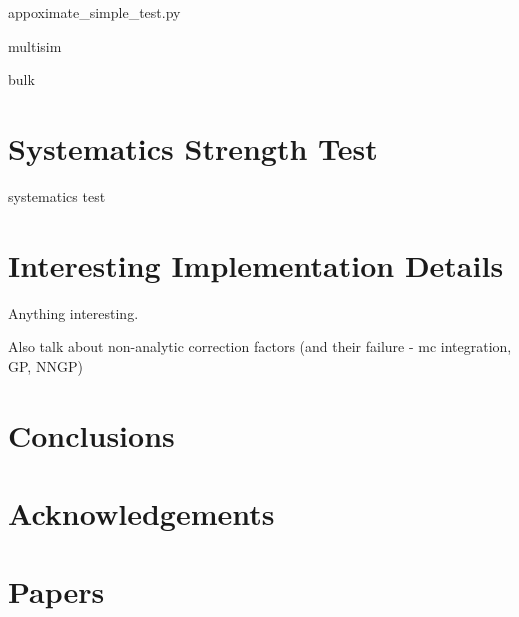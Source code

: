 \documentclass[a4paper,fleqn,usenatbib]{mnras}
\begin{document}
appoximate\_simple\_test.py

multisim

bulk

\section{Systematics Strength Test}

systematics test

\section{Interesting Implementation Details}

Anything interesting.

Also talk about non-analytic correction factors (and their failure - mc integration, GP, NNGP)



\section{Conclusions}



\section*{Acknowledgements}














\appendix

\section{Papers}






\bsp	%
\label{lastpage}
\end{document}
